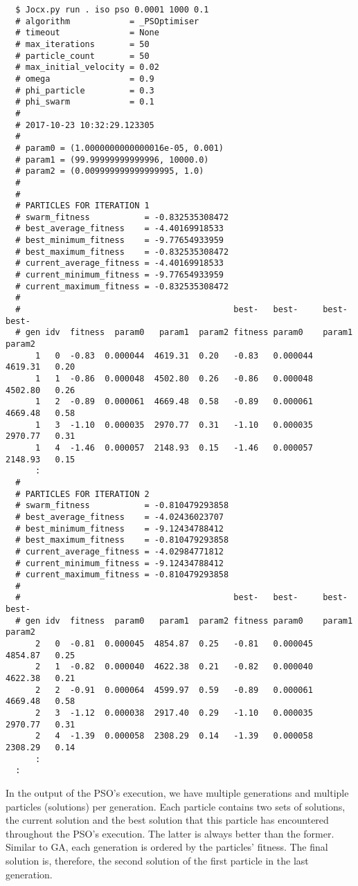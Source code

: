 {\small{}\begin{verbatim}
  $ Jocx.py run . iso pso 0.0001 1000 0.1
  # algorithm            = _PSOptimiser
  # timeout              = None
  # max_iterations       = 50
  # particle_count       = 50
  # max_initial_velocity = 0.02
  # omega                = 0.9
  # phi_particle         = 0.3
  # phi_swarm            = 0.1
  #
  # 2017-10-23 10:32:29.123305
  #
  # param0 = (1.0000000000000016e-05, 0.001)
  # param1 = (99.99999999999996, 10000.0)
  # param2 = (0.009999999999999995, 1.0)
  #
  #
  # PARTICLES FOR ITERATION 1
  # swarm_fitness           = -0.832535308472
  # best_average_fitness    = -4.40169918533
  # best_minimum_fitness    = -9.77654933959
  # best_maximum_fitness    = -0.832535308472
  # current_average_fitness = -4.40169918533
  # current_minimum_fitness = -9.77654933959
  # current_maximum_fitness = -0.832535308472
  #
  #                                           best-   best-     best-     best-
  # gen idv  fitness  param0   param1  param2 fitness param0    param1    param2
      1   0  -0.83  0.000044  4619.31  0.20   -0.83   0.000044  4619.31   0.20
      1   1  -0.86  0.000048  4502.80  0.26   -0.86   0.000048  4502.80   0.26
      1   2  -0.89  0.000061  4669.48  0.58   -0.89   0.000061  4669.48   0.58
      1   3  -1.10  0.000035  2970.77  0.31   -1.10   0.000035  2970.77   0.31
      1   4  -1.46  0.000057  2148.93  0.15   -1.46   0.000057  2148.93   0.15
      :
  #
  # PARTICLES FOR ITERATION 2
  # swarm_fitness           = -0.810479293858
  # best_average_fitness    = -4.02436023707
  # best_minimum_fitness    = -9.12434788412
  # best_maximum_fitness    = -0.810479293858
  # current_average_fitness = -4.02984771812
  # current_minimum_fitness = -9.12434788412
  # current_maximum_fitness = -0.810479293858
  #
  #                                           best-   best-     best-     best-
  # gen idv  fitness  param0   param1  param2 fitness param0    param1    param2
      2   0  -0.81  0.000045  4854.87  0.25   -0.81   0.000045  4854.87   0.25
      2   1  -0.82  0.000040  4622.38  0.21   -0.82   0.000040  4622.38   0.21
      2   2  -0.91  0.000064  4599.97  0.59   -0.89   0.000061  4669.48   0.58
      2   3  -1.12  0.000038  2917.40  0.29   -1.10   0.000035  2970.77   0.31
      2   4  -1.39  0.000058  2308.29  0.14   -1.39   0.000058  2308.29   0.14
      :
  :
\end{verbatim}}

In the output of the PSO's execution, we have multiple generations and multiple
particles (solutions) per generation. Each particle contains two sets of
solutions, the current solution and the best solution that this particle has
encountered throughout the PSO's execution. The latter is always better than the
former. Similar to GA, each generation is ordered by the particles' fitness. The
final solution is, therefore, the second solution of the first particle in the
last generation.
